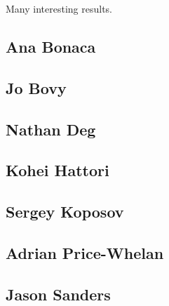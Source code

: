 Many interesting results.

\subsection{Ana Bonaca}\label{ssec:ana_results}


\subsection{Jo Bovy}\label{ssec:jo_results}


\subsection{Nathan Deg}\label{ssec:nathan_results}


\subsection{Kohei Hattori}\label{ssec:kohei_results}


\subsection{Sergey Koposov}\label{ssec:sergey_results}


\subsection{Adrian Price-Whelan}\label{ssec:adrian_results}


\subsection{Jason Sanders}\label{ssec:jason_results}

